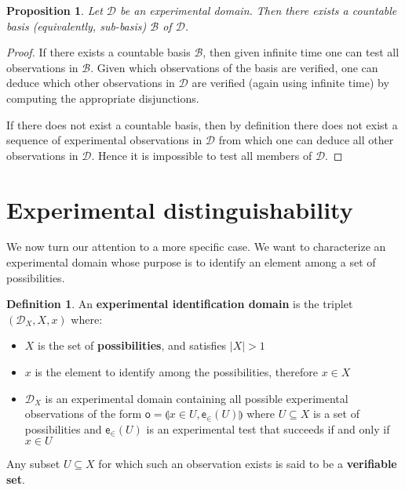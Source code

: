 \documentclass{amsart}
\newtheorem{prop}[thm]{Proposition}
\theoremstyle{definition}
\newtheorem{defn}[thm]{Definition}
\numberwithin{equation}{section}
\begin{document}
\begin{prop}
Let $\mathcal{D}$ be an experimental domain. Then there exists a countable basis (equivalently, sub-basis) $\mathcal{B}$ of $\mathcal{D}$.
\end{prop}

\begin{proof}
If there exists a countable basis $\mathcal{B}$, then given infinite time one can test all observations in $\mathcal{B}$. Given which observations of the basis are verified, one can deduce which other observations in $\mathcal{D}$ are verified (again using infinite time) by computing the appropriate disjunctions. 

If there does not exist a countable basis, then by definition there does not exist a sequence of experimental observations in $\mathcal{D}$ from which one can deduce all other observations in $\mathcal{D}$. Hence it is impossible to test all members of $\mathcal{D}$.
\end{proof}

\section{\bf Experimental distinguishability}

We now turn our attention to a more specific case. We want to characterize an experimental domain whose purpose is to identify an element among a set of possibilities.

\begin{defn}
	An \textbf{experimental identification domain} is the triplet \linebreak $(\mathcal{D}_X, X, x)$ where:
	\begin{itemize}
		\item $X$ is the set of \textbf{possibilities}, and satisfies $|X|>1$
		\item $x$ is the element to identify among the possibilities, therefore $x \in X$
		\item $\mathcal{D}_X$ is an experimental domain containing all possible experimental observations of the form $\mathsf{o} = \llparenthesis x\in U, \mathsf{e}_\in(U)\rrparenthesis$ where $U \subseteq X$ is a set of possibilities and $\mathsf{e}_\in(U)$ is an experimental test that succeeds if and only if $x \in U$
	\end{itemize}
	Any subset $U\subseteq X$ for which such an observation exists is said to be a \textbf{verifiable set}.
\end{defn}
\end{document}
